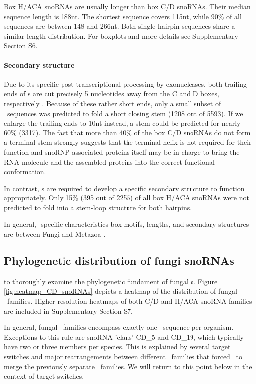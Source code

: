 Box H/ACA snoRNAs are usually longer than box C/D snoRNAs. Their median
sequence length is 188nt. The shortest sequence covers 115nt, while 90\% of
all sequences are between 148 and 266nt.  Both single hairpin sequences
share a similar length distribution. For boxplots and more details see
Supplementary Section S6.

\paragraph{\textbf{Secondary structure}} Due to its specific
post-transcriptional processing by exonucleases, both trailing ends of \cd
s are cut precisely 5 nucleotides away from the C and D boxes, respectively
\citep{Kishore:2013}. Because of these rather short ends, only a small
subset of \sno\ sequences was predicted to fold a short closing stem (1208
out of 5593).  If we enlarge the trailing ends to 10nt instead, a stem
could be predicted for nearly 60\% (3317). The fact that more than 40\% of
the box C/D snoRNAs do not form a terminal stem strongly suggests that the
terminal helix is not required for their function and snoRNP-associated
proteins itself may be in charge to bring the RNA molecule and the
assembled proteins into the correct functional conformation.

In contrast, \haca s are required to develop a 
specific secondary structure to function appropriately. Only 15\% (395
out of 2255) of all box H/ACA snoRNAs were not predicted to fold into
a stem-loop structure for both hairpins.

In general, \sno -specific characteristics  box motifs,
lengths, and secondary structures are  between Fungi and
Metazoa \cite{Kehr:2014}.

\subsection{Phylogenetic distribution of fungi snoRNAs}

 to
thoroughly examine the phylogenetic fundament of fungal \sno s.  Figure
\ref{fig:heatmap_CD_snoRNAs} depicts a heatmap of the distribution of
fungal \cd\ families.  Higher resolution heatmaps of both C/D and H/ACA
snoRNA families are included in Supplementary Section S7.

In general, fungal \sno\ families encompass exactly one \sno\ sequence per
organism. Exceptions to this rule are  snoRNA 'clans' CD\_5 and
CD\_19, which typically have two or three members per species.  This is
explained by several target switches and major rearrangements between
different \sno\ families that forced \snostrip\ to merge the previously
separate \sno\ families. We will return to this point below in the context
of target switches.


